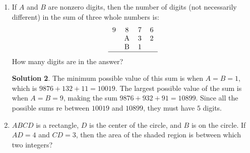 \documentclass{article}
\theoremstyle{definition}
\newtheorem*{solution}{Solution}
\begin{document}
\begin{multicols*}{2}
\begin{enumerate}
\begin{center}
            \end{center}
            \begin{solution}
                Fold the four squares into four sides of a cube.
                Then, there are six edges ``open'' (for lack of better term).
                For each open edge, we can add a square/side, so the answer is $6$
            \end{solution}
        \item If $A$ and $B$ are nonzero digits, then the number of digits (not necessarily different) in the sum of three whole numbers is:
            $$\begin{tabular}{ccccc}
                9 & 8 & 7 & 6 \\
                & A & 3 & 2 \\
                & B & 1 & \\
                \hline
            \end{tabular}$$
            How many digits are in the answer?
            \begin{solution}
                The minimum possible value of this sum is when $A = B = 1$, which is $9876 + 132 + 11 = 10019$.
                The largest possible value of the sum is when $A = B = 9$, making the sum $9876 + 932 + 91 = 10899$.
                Since all the possible sums re between $10019$ and $10899$, they must have $5$ digits.
            \end{solution}
        \item $ABCD$ is a rectangle, $D$ is the center of the circle, and $B$ is on the circle.
            If $AD = 4$ and $CD = 3$, then the area of the shaded region is between which two integers?
            \begin{center}
\end{center}
\end{enumerate}
\end{multicols*}
\end{document}
